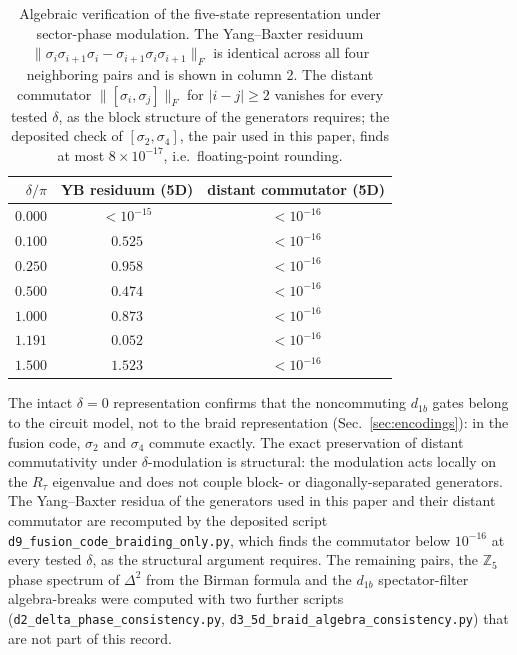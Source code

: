 \documentclass[aps,pra,twocolumn,superscriptaddress,longbibliography,floatfix,nofootinbib]{revtex4-2}
\begin{document}
\begin{table}[h]
\caption{Algebraic verification of the five-state representation under
sector-phase modulation. The Yang--Baxter residuum
$\|\sigma_i\sigma_{i+1}\sigma_i - \sigma_{i+1}\sigma_i\sigma_{i+1}\|_F$
is identical across all four neighboring pairs and is shown in column 2.
The distant commutator $\|[\sigma_i, \sigma_j]\|_F$ for $|i-j| \geq 2$
vanishes for every tested $\delta$, as the block structure of the
generators requires; the deposited check of $[\sigma_2,\sigma_4]$, the
pair used in this paper, finds at most $8\times10^{-17}$, i.e.\
floating-point rounding.}
\label{tab:yb_under_delta}
\begin{ruledtabular}
\begin{tabular}{rcc}
$\delta/\pi$ & YB residuum (5D) & distant commutator (5D) \\
\hline
$0.000$ & $< 10^{-15}$ & $< 10^{-16}$ \\
$0.100$ & $0.525$ & $< 10^{-16}$ \\
$0.250$ & $0.958$ & $< 10^{-16}$ \\
$0.500$ & $0.474$ & $< 10^{-16}$ \\
$1.000$ & $0.873$ & $< 10^{-16}$ \\
$1.191$ & $0.052$ & $< 10^{-16}$ \\
$1.500$ & $1.523$ & $< 10^{-16}$ \\
\end{tabular}
\end{ruledtabular}
\end{table}

The intact $\delta = 0$ representation confirms that the noncommuting
$d_{1b}$ gates belong to the circuit model, not to the braid
representation (Sec.~\ref{sec:encodings}): in the fusion code,
$\sigma_2$ and $\sigma_4$ commute exactly.
The exact preservation of distant commutativity
under $\delta$-modulation is structural: the modulation acts locally
on the $R_\tau$ eigenvalue and does not couple block- or
diagonally-separated generators.
The Yang--Baxter residua of the generators used in this paper and
their distant commutator are recomputed by the deposited script
\texttt{d9\_fusion\_code\_braiding\_only.py}, which finds the commutator
below $10^{-16}$ at every tested $\delta$, as the structural argument
requires. The remaining pairs, the $\mathbb{Z}_5$ phase spectrum of
$\Delta^2$ from the Birman formula and the $d_{1b}$ spectator-filter
algebra-breaks were computed with two further scripts
(\texttt{d2\_delta\_phase\_consistency.py},
\texttt{d3\_5d\_braid\_algebra\_consistency.py}) that are not part of
this record.
\end{document}
